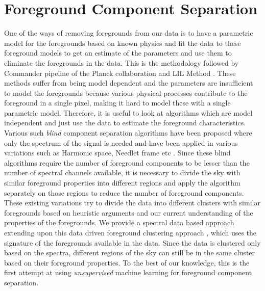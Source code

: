 \chapter{Foreground Component Separation}
\label{fg_comp}
One of the ways of removing foregrounds from our data is to have a parametric model for the
foregrounds based on known physics and fit the data to these foreground models to get an
estimate of the parameters and use them to eliminate the foregrounds in the data. This is
the methodology followed by Commander pipeline of the Planck collaboration \cite{cmbpara} and LIL Method
\cite{lilrishi}. These methods suffer from being model dependent and the parameters are
insufficient to model the foregrounds because various physical processes
contribute to the foreground in a single pixel, making it hard to model these with a single
parametric model. Therefore, it is useful to look at
algorithms which are model independent and just use the data to estimate the foreground
characteristics.\\
Various such \emph{blind} component separation algorithms have been proposed where
only the spectrum of the signal is needed \cite{ilc,gilc} and have been applied in various
variations such as Harmonic space, Needlet frame etc \cite{harmonicilc, needlet}. Since these
blind algorithms require the number of foreground components to be lesser than the
number of spectral channels available, it is necessary to divide the sky with similar foreground
properties into different regions and apply the algorithm separately on those regions to reduce
the number of foreground components. These existing variations try to divide the data into
different clusters with similar foregrounds based on heuristic arguments and
our current understanding of the
properties of the foregrounds. We provide a spectral data based
approach extending upon this data driven foreground clustering approach \cite{datarishi}, which
uses the signature of the foregrounds available in the data.
Since the data is clustered only based on the spectra, different regions of the sky can still be
in the same cluster based on their foreground properties. To the best of our
knowledge, this is the first attempt at using \emph{unsupervised} machine learning for foreground
component separation.  

